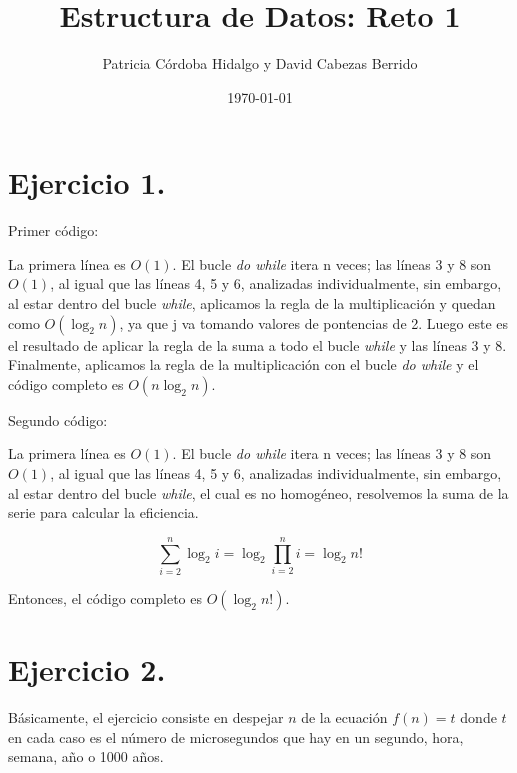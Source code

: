 \documentclass{article}
\begin{document}
\title{Estructura de Datos: Reto 1}
\author{Patricia Córdoba Hidalgo y David Cabezas Berrido}
\date{\today}
\maketitle



\section*{Ejercicio 1.}

Primer código:
\begin{justify}
    La primera línea es $O(1)$. El bucle \textit{do while} itera n
    veces; las líneas 3 y 8 son $O(1)$, al igual que las líneas 4, 5 y
    6, analizadas individualmente, sin embargo, al estar dentro del
    bucle \textit{while}, aplicamos la regla de la multiplicación y
    quedan como $O(\log_{2}{n})$, ya que j va tomando valores de
    pontencias de 2. Luego este es el resultado de aplicar la regla de
    la suma a todo el bucle \textit{while} y las líneas 3 y
    8. Finalmente, aplicamos la regla de la multiplicación con el
    bucle \textit{do while} y el código completo es $O(n\log_{2}{n})$.
\end{justify}

Segundo código:
\begin{justify}
  La primera línea es $O(1)$. El bucle \textit{do while} itera n
  veces; las líneas 3 y 8 son $O(1)$, al igual que las líneas 4, 5 y
  6, analizadas individualmente, sin embargo, al estar dentro del
  bucle \textit{while}, el cual es no homogéneo, resolvemos la suma de
  la serie para calcular la eficiencia.
\end{justify}

\[
  \sum\limits_{i=2}^{n}\log_2i=\log_2\prod\limits_{i=2}^ni=\log_2n!
  \]

\begin{justify}
  Entonces, el código completo es $O(\log_2n!).$
\end{justify}

\section*{Ejercicio 2.}

\begin{justify}
  Básicamente, el ejercicio consiste en despejar $n$ de la ecuación
  $f(n)=t$ donde $t$ en cada caso es el número de microsegundos que
  hay en un segundo, hora, semana, año o 1000 años.
\end{justify}
\end{document}
